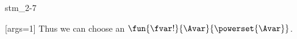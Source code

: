 \documentclass{stex}
\begin{document}
\begin{smodule}{stm_2-7}

  \begin{sassertion}[id=stm-2.7]
    [args=1]{}
    Thus we can choose an  
    $\fun{\fvar!}{\Avar}{\powerset{\Avar}}$.
  \end{sassertion}
\end{smodule}
\end{document}
